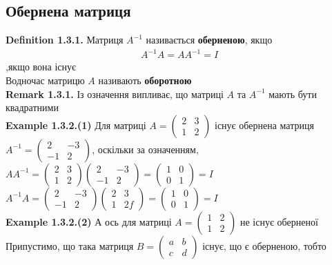 \documentclass[a4paper, 14pt]{extarticle}
\def\defin#1{\textbf{Definition {#1}}}
\def\ex#1{\textbf{Example {#1}}}
\def\rm#1{\textbf{Remark {#1}}}
\def\bigline{\vspace{5mm}\\}
\begin{document}
	\subsection{Обернена матриця}
	\defin{1.3.1.} Матриця $A^{-1}$ називається \textbf{оберненою}, якщо
	\begin{align*}
	A^{-1} A = A A^{-1} = I
	\end{align*}
	,якщо вона існує\\
	Водночас матрицю $A$ називають \textbf{оборотною}
	\bigline
	\rm{1.3.1.} Із означення випливає, що матриці $A$ та $A^{-1}$ мають бути квадратними 
	\bigline
	\ex{1.3.2.(1)} Для матриці $A = \begin{pmatrix}
	2 & 3 \\
	1 & 2
	\end{pmatrix}$ існує обернена матриця $A^{-1} = \begin{pmatrix}
	2 & -3 \\
	-1 & 2
	\end{pmatrix}$, оскільки за означенням,\\
	$AA^{-1} = \begin{pmatrix}
	2 & 3 \\
	1 & 2
	\end{pmatrix} \begin{pmatrix}
	2 & -3 \\
	-1 & 2
	\end{pmatrix} = \begin{pmatrix}
	1 & 0 \\
	0 & 1
	\end{pmatrix} = I$\\
	$A^{-1}A = \begin{pmatrix}
	2 & -3 \\
	-1 & 2
	\end{pmatrix} \begin{pmatrix}
	2 & 3 \\
	1 & 2f
	\end{pmatrix} = \begin{pmatrix}
	1 & 0 \\
	0 & 1
	\end{pmatrix} = I$
	\bigline
	\ex{1.3.2.(2)} А ось для матриці $A = \begin{pmatrix}
	1 & 2 \\
	1 & 2
	\end{pmatrix}$ не існує оберненої\\
	Припустимо, що така матриця $B = \begin{pmatrix}
	a & b \\
	c & d
	\end{pmatrix}$ існує, що є оберненою, тобто\\
\end{document}
